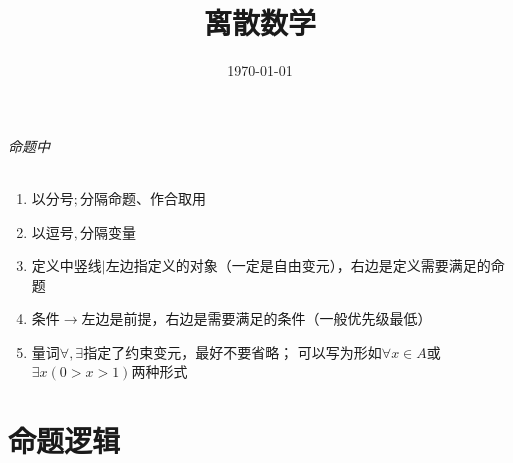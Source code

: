 \documentclass{article}
\title{离散数学}
\author{}
\date{\today}
\begin{document}
\hypersetup{
    hidelinks,
    allcolors = black,
    breaklinks = true
}

\newtheorem{definition}{Definition}[subsection]
\newtheorem{theorem}{Theorem}[subsection]
\newtheorem{corollary}{Corollary}[theorem]
\renewcommand{\proofname}{\indent\bf Proof}

\def\e{\mathrm e}
\def\i{\mathrm i}
\def\j{\mathrm j}
\def\d{\mathrm d}
\def\C{\mathrm C}
\def\div{\mathrm{div}}
\def\rot{\mathrm{rot}}
\def\vecv{\vec{\mathrm v}}
\def\sr{\mathbb R}
\def\sn{\mathbb N}
\def\snp{\mathbb N^+}
\def\sc{\mathbb C}
\def\sz{\mathbb Z}
\def\impint{\int\limits_{-\infty}^{+\infty}}

\newcommand{\abs}[1]{\left|#1\right|}
\newcommand{\pare}[1]{\left(#1\right)}
\newcommand{\pair}[2]{\left<#1,#2\right>}
\newcommand{\jacobi}[2]{\frac{\partial\pare{#1}}{\partial\pare{#2}}}
\newcommand{\conditionset}[2]{\left\{#1|#2\right\}}

\begin{titlepage}
    \maketitle
\end{titlepage}

\tableofcontents
\newpage

\paragraph{命题中}

\begin{enumerate}
    \item 以分号$;$分隔命题、作合取用
    \item 以逗号$,$分隔变量
    \item 定义中竖线$|$左边指定义的对象（一定是自由变元），右边是定义需要满足的命题
    \item 条件$\to$左边是前提，右边是需要满足的条件（一般优先级最低）
    \item 量词$\forall,\exists$指定了约束变元，最好不要省略；
          可以写为形如$\forall x\in A$或$\exists x\pare{0>x>1}$两种形式
\end{enumerate}

\part{命题逻辑}
\end{document}
